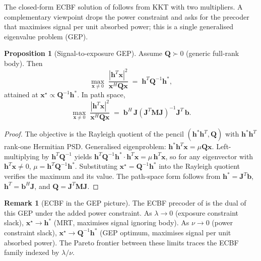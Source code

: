 \documentclass[11pt,a4paper]{article}
\theoremstyle{definition}
\newtheorem{proposition}[proposition]{Proposition}
\newtheorem{remark}[remark]{Remark}
\newcommand{\Jmat}{\mathbf{J}}                 %
\newcommand{\Mmat}{\mathbf{M}}                 %
\newcommand{\Qmat}{\mathbf{Q}}                 %
\newcommand{\xx}{\mathbf{x}}
\newcommand{\hh}{\mathbf{h}}
\newcommand{\bvec}{\mathbf{b}}
\begin{document}
The closed-form ECBF solution of  follows from KKT with
two multipliers.  A complementary viewpoint drops the power constraint
and asks for the precoder that maximises signal per unit absorbed power;
this is a single generalised eigenvalue problem (GEP).

\begin{proposition}[Signal-to-exposure GEP]\label{prop:GEP}
Assume $\Qmat\succ0$ (generic full-rank body).  Then
\begin{equation}\label{eq:GEP}
  \max_{\xx\ne 0}\;\frac{|\hh^T\xx|^2}{\xx^H\Qmat\xx}
  \;=\;\hh^T\Qmat^{-1}\hh^*,
\end{equation}
attained at $\xx^\star\propto\Qmat^{-1}\hh^*$.  In path space,
\begin{equation}\label{eq:GEP-path}
  \max_{\xx\ne 0}\;\frac{|\hh^T\xx|^2}{\xx^H\Qmat\xx}
  \;=\;\bvec^H\,\Jmat(\Jmat^T\Mmat\Jmat)^{-1}\Jmat^T\,\bvec.
\end{equation}
\end{proposition}

\begin{proof}
The objective is the Rayleigh quotient of the pencil $(\hh^*\hh^T,\Qmat)$
with $\hh^*\hh^T$ rank-one Hermitian PSD.  Generalised eigenproblem:
$\hh^*\hh^T\xx=\mu\Qmat\xx$.  Left-multiplying by $\hh^T\Qmat^{-1}$ yields
$\hh^T\Qmat^{-1}\hh^*\cdot\hh^T\xx=\mu\,\hh^T\xx$, so for any eigenvector
with $\hh^T\xx\ne 0$, $\mu=\hh^T\Qmat^{-1}\hh^*$.  Substituting $\xx^\star
=\Qmat^{-1}\hh^*$ into the Rayleigh quotient verifies the maximum and its
value.  The path-space form follows from $\hh^*=\Jmat^T\bvec$,
$\hh^T=\bvec^H\Jmat$, and $\Qmat=\Jmat^T\Mmat\Jmat$.
\end{proof}

\begin{remark}[ECBF in the GEP picture]\label{rem:gep-ecbf}
The ECBF precoder of  is the dual of this GEP under the
added power constraint.  As $\lambda\to 0$ (exposure constraint slack),
$\xx^\star\to\hh^*$ (MRT, maximises signal ignoring body).  As
$\nu\to 0$ (power constraint slack), $\xx^\star\to\Qmat^{-1}\hh^*$ (GEP
optimum, maximises signal per unit absorbed power).  The Pareto frontier
between these limits traces the ECBF family indexed by $\lambda/\nu$.
\end{remark}
\end{document}
